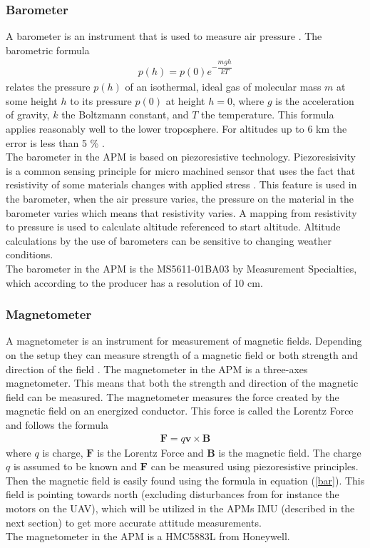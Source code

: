 \subsubsection{Barometer}
A barometer is an instrument that is used to measure air pressure \citep{barometer}. The barometric formula 
\begin{eqnarray}
p(h) = p(0)e^{-\dfrac{mgh}{kT}}
\label{barometer}
\end{eqnarray}
relates the pressure $p(h)$ of an isothermal, ideal gas of molecular mass $m$ at some height $h$ to its pressure $p(0)$ at height $h = 0$, where $g$ is the acceleration of gravity, $k$ the Boltzmann constant, and $T$ the temperature. This formula applies reasonably well to the lower troposphere. For altitudes up to 6 km the error is less than 5 \% \citep{Berberan-Santos1997}.\\
\newline
The barometer in the APM is based on piezoresistive technology. Piezoresisivity is a common sensing principle for micro machined sensor \citep{mems} that uses the fact that resistivity of some materials changes with applied stress \citep{Mason1957}. This feature is used in the barometer, when the air pressure varies, the pressure on the material in the barometer varies which means that resistivity varies. A mapping from resistivity to pressure is used to calculate altitude referenced to start altitude. Altitude calculations by the use of barometers can be sensitive to changing weather conditions.\\\newline
The barometer in the APM is the MS5611-01BA03 by Measurement Specialties, which according to the producer has a resolution of 10 cm.
\subsubsection{Magnetometer}
 A magnetometer is an instrument for measurement of magnetic fields. Depending on the setup they can measure strength of a magnetic field or both strength and direction of the field \citep{mag}. The magnetometer in the APM is a three-axes magnetometer. This means that both the strength and direction of the magnetic field can be measured. The magnetometer measures the force created by the magnetic field on an energized conductor. This force is called the Lorentz Force and follows the formula
 \begin{eqnarray}
 \boldsymbol{F} = q\boldsymbol{v} \times \boldsymbol{B}
 \label{bar}
 \end{eqnarray}
 where $q$ is charge, $\boldsymbol{F}$ is the Lorentz Force and $\boldsymbol{B}$ is the magnetic field. The charge $q$ is assumed to be known and $\boldsymbol{F}$ can be measured using piezoresistive principles. Then the magnetic field is easily found using the formula in equation (\ref{bar}). This field is pointing towards north (excluding disturbances from for instance the motors on the UAV), which will be utilized in the APMs IMU (described in the next section) to get more accurate attitude measurements.\\
\newline
The magnetometer in the APM is a HMC5883L from Honeywell.
